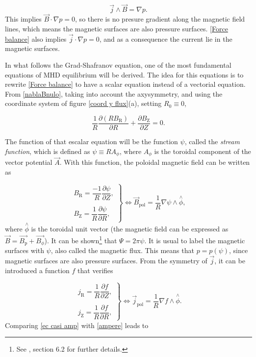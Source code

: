 \documentclass[a4paper,12pt,oneside]{book}
\newcommand{\p}{\partial}
\begin{document}
\begin{equation} \label{Force balance}
\vec{j} \wedge \vec{B} = \nabla p .
\end{equation}
%
This implies $\vec{B} \cdot \nabla p=0$, so there is no presure gradient along the magnetic field lines, which means the magnetic surfaces are also pressure surfaces. \eqref{Force balance} also implies $\vec{j} \cdot \nabla p=0$, and as a consequence the current lie in the magnetic surfaces. 

In what follows the Grad-Shafranov equation, one of the most fundamental equations of MHD equilibrium will be derived. The idea for this equations is to rewrite \eqref{Force balance} to have a scalar equation instead of a vectorial equation. From \eqref{nablaBnulo}, taking into account the axysymmetry, and using the coordinate system of figure \ref{coord y flux}(a), setting $R_0 \equiv 0$,

\begin{equation}
\dfrac{1}{R} \dfrac{\p (RB_\text{R})}{\p R}+ \dfrac{\p B_\text{Z}}{\p Z}=0.
\end{equation}

The function of that escalar equation will be the function $\psi$, called the \textit{stream function}, which is defined as $\psi \equiv R A_\phi$, where $A_\phi$ is the toroidal component of the vector potential $\vec{A}$. With this function, the poloidal magnetic field can be written as

\begin{equation}\label{ec 1}
\left.
\begin{array}{c}
B_\text{R}=\dfrac{-1}{R} \dfrac{\p \psi}{\p Z}, \\
\\
 B_\text{Z}=\dfrac{1}{R} \dfrac{\p \psi}{\p R},
\end{array}
\right\}
\Leftrightarrow \vec{B}_\text{pol}=\dfrac{1}{R} \nabla \psi \wedge \stackrel{\wedge}{\phi},
\end{equation}
%
where $\stackrel{\wedge}{\phi}$ is the toroidal unit vector (the magnetic field can be expressed as $\vec{B}=\vec{B_\text{p}} +\vec{B_\phi}$). It can be shown\footnote{See \cite{Fried}, section 6.2 for further details.} that $\Psi=2 \pi \psi$. It is usual to label the magnetic surfaces with $\psi$, also called the magnetic flux. This means that $p=p(\psi)$, since magnetic surfaces are also pressure surfaces.  From the symmetry of $\vec{j}$, it can be introduced a function $f$ that verifies

\begin{equation} \label{ec casi amp}
\left.
\begin{array}{c}
j_\text{R}=\dfrac{1}{R} \dfrac{\p f}{\p Z}, \\
\\
 j_\text{Z}=\dfrac{1}{R} \dfrac{\p f}{\p R},
\end{array}
\right\}
\Leftrightarrow \vec{j}_\text{pol}=\dfrac{1}{R}\nabla f \wedge \stackrel{\wedge}{\phi}.
\end{equation}
%
Comparing \eqref{ec casi amp} with \eqref{ampere} leads to
\end{document}

